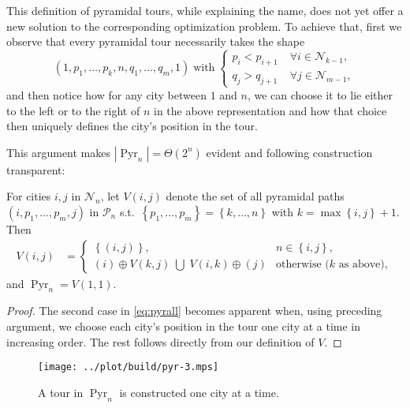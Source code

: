 \documentclass[index=totoc,bibliography=totoc]{scrartcl}
\numberwithin{equation}{section}
\numberwithin{figure}{section}
\numberwithin{table}{section}
\begin{document}
This definition of pyramidal tours, while explaining the name, does not yet
offer a new solution to the corresponding optimization problem.  To achieve
that, first we observe that every pyramidal tour necessarily takes the
shape
\[
\left(1, p_1, \ldots, p_k, n, q_1, \ldots, q_m, 1 \right)
\; \text{with} \;
\begin{cases}
  p_i < p_{i+1} \; & \forall i \in \mathcal{N}_{k-1},\\
  q_j > q_{j+1} \; & \forall j \in \mathcal{N}_{m-1},
\end{cases}
\]
and then notice how for any city between $1$ and $n$,
we can choose it to lie either to the left or to the right of $n$ in the above representation
and how that choice then uniquely defines the city's position in the tour.

This argument makes $\left|\operatorname{Pyr}_n\right| = \Theta\left(2^n\right)$
evident and following construction transparent:

\begin{proposition}
\label{prop:pyrall}
  For cities $i,j$ in $\mathcal{N}_n$,
  let $V\left(i,j\right)$ denote the set of all pyramidal paths
  $\left(i,p_1,\ldots,p_m,j\right)$
  in $\mathcal{P}_n$
  s.t.\ $\left\{p_1,\ldots,p_m\right\} = \left\{k,\ldots,n\right\}$
  with $k = \max\left\{i,j\right\}+1$.  Then
  \begin{align}
    \label{eq:pyrall}
    V\left(i,j\right) & =
    \begin{cases}
      \left\{\left(i,j\right)\right\}, & n \in \left\{i,j\right\},
      \\
      \left(i\right) \oplus V\left(k,j\right)
      \;\bigcup\;
      V\left(i,k\right) \oplus \left(j\right)
      & \text{otherwise ($k$ as above)},
    \end{cases}
  \end{align}
  and $\operatorname{Pyr}_n = V\left(1,1\right)$.
\end{proposition}
\begin{proof}
  The second case in \cref{eq:pyrall} becomes apparent when, using
  preceding argument, we choose each city's position in the tour one city
  at a time in increasing order.  The rest follows directly from our
  definition of $V$.
\end{proof}

\begin{figure}[hbt]
  \centering
  \texttt{[image: ../plot/build/pyr-3.mps]}
  \label{fig:pyrpart}
  \caption{A tour in $\operatorname{Pyr}_n$ is constructed one city at a time.}
\end{figure}
\end{document}
